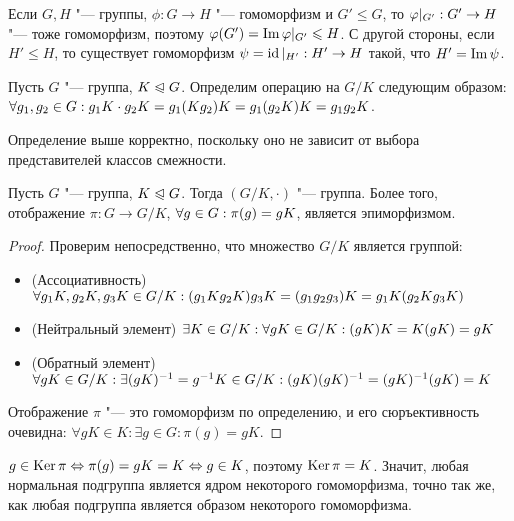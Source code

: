 \begin{note}
	Если $G, H$ "--- группы, $\phi: G \to H$ "--- гомоморфизм и $G' \le G$, то $\phi|_{G'}: G' \hm\to H$ "--- тоже гомоморфизм, поэтому $\phi(G') \hm= \im\phi|_{G'} \le H$. С другой стороны, если $H' \le H$, то существует гомоморфизм $\psi = \operatorname{id}|_{H'}: H' \to H$ такой, что $H' = \operatorname{Im}\psi$.
\end{note}

\begin{definition}
	Пусть $G$ "--- группа, $K \trianglelefteqslant G$. Определим операцию на $G / K$ следующим образом: $\forall g_1, g_2 \in G: g_1K\cdot g_2K \hm= g_1(Kg_2)K = g_1(g_2K)K = g_1g_2K$.
\end{definition}

\begin{note}
	Определение выше корректно, поскольку оно не зависит от выбора представителей классов смежности.
\end{note}

\begin{proposition}
	Пусть $G$ "--- группа, $K \trianglelefteqslant G$. Тогда $(G / K, \cdot)$ "--- группа. Более того, отображение $\pi: G \to G / K$, $\forall g \in G: \pi(g) \hm= gK$, является эпиморфизмом.
\end{proposition}

\begin{proof}
	Проверим непосредственно, что множество $G / K$ является группой:
	\begin{itemize}
		\item (Ассоциативность) $\forall g_1K, g_2K, g_3K \in G / K: (g_1Kg_2K)g_3K \hm= (g_1g_2g_3)K \hm= g_1K(g_2Kg_3K)$
		\item (Нейтральный элемент) $\exists K \in G / K: \forall gK \in G / K: (gK)K \hm= K(gK) = gK$
		\item (Обратный элемент) $\forall gK \in G / K: \exists (gK)^{-1} = g^{-1}K \in G / K: (gK)(gK)^{-1} \hm= (gK)^{-1}(gK) = K$
	\end{itemize}
	
	Отображение $\pi$ "--- это гомоморфизм по определению, и его сюръективность очевидна: $\forall gK \in K: \exists g \in G: \pi(g) = gK$.
\end{proof}

\begin{note}
	$g \in \operatorname{Ker}\pi \Leftrightarrow \pi(g) = gK = K \Leftrightarrow g \in K$, поэтому $\operatorname{Ker}\pi = K$. Значит, любая нормальная подгруппа является ядром некоторого гомоморфизма, точно так же, как любая подгруппа является образом некоторого гомоморфизма.
\end{note}

